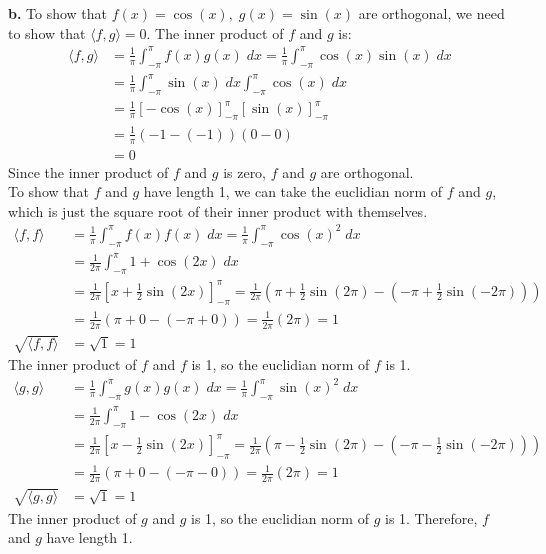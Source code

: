 \documentclass{article}
\begin{document}
\vspace{0.25cm}
\noindent\textbf{b.} To show that $f(x) = \cos(x), \; g(x) = \sin(x)$ are orthogonal, we need to show that $\langle f, g \rangle = 0$.
The inner product of $f$ and $g$ is:
\begin{align*}
    \langle f, g \rangle &= \frac{1}{\pi} \int_{-\pi}^{\pi} f(x)g(x)\;dx = \frac{1}{\pi} \int_{-\pi}^{\pi} \cos(x)\sin(x)\;dx \\
    &= \frac{1}{\pi} \int_{-\pi}^{\pi} \sin(x) \; dx \int_{-\pi}^{\pi} \cos(x) \; dx \\
    &= \frac{1}{\pi} \left[ -\cos(x) \right]_{-\pi}^{\pi} \left[ \sin(x) \right]_{-\pi}^{\pi} \\
    &= \frac{1}{\pi} (-1 - (-1)) (0 - 0) \\
    &= 0
\end{align*}
Since the inner product of $f$ and $g$ is zero, $f$ and $g$ are orthogonal. \\
To show that $f$ and $g$ have length 1, we can take the euclidian norm of $f$ and $g$, which is just the square root of their inner product with themselves.
\begin{align*}
    \langle f, f \rangle &= \frac{1}{\pi} \int_{-\pi}^{\pi} f(x)f(x)\;dx = \frac{1}{\pi} \int_{-\pi}^{\pi} \cos(x)^2\;dx \\
    &= \frac{1}{2 \pi} \int_{-\pi}^{\pi} 1 + \cos(2x)\;dx \\
    &= \frac{1}{2 \pi} \left[ x + \frac{1}{2} \sin(2x) \right]_{-\pi}^{\pi} = \frac{1}{2 \pi} \left( \pi + \frac{1}{2} \sin(2\pi) - (-\pi + \frac{1}{2} \sin(-2\pi)) \right) \\
    &= \frac{1}{2 \pi} \left( \pi + 0 - (-\pi + 0) \right) = \frac{1}{2 \pi} (2\pi) = 1 \\
    \sqrt{\langle f, f \rangle} &= \sqrt{1} = 1
\end{align*}
The inner product of $f$ and $f$ is 1, so the euclidian norm of $f$ is 1.
\begin{align*}
    \langle g, g \rangle &= \frac{1}{\pi} \int_{-\pi}^{\pi} g(x)g(x)\;dx = \frac{1}{\pi} \int_{-\pi}^{\pi} \sin(x)^2\;dx \\
    &= \frac{1}{2 \pi} \int_{-\pi}^{\pi} 1 - \cos(2x)\;dx \\
    &= \frac{1}{2 \pi} \left[ x - \frac{1}{2} \sin(2x) \right]_{-\pi}^{\pi} = \frac{1}{2 \pi} \left( \pi - \frac{1}{2} \sin(2\pi) - (-\pi - \frac{1}{2} \sin(-2\pi)) \right) \\
    &= \frac{1}{2 \pi} \left( \pi + 0 - (-\pi - 0) \right) = \frac{1}{2 \pi} (2\pi) = 1 \\
    \sqrt{\langle g, g \rangle} &= \sqrt{1} = 1
\end{align*}
The inner product of $g$ and $g$ is 1, so the euclidian norm of $g$ is 1.
Therefore, $f$ and $g$ have length 1.
\end{document}
